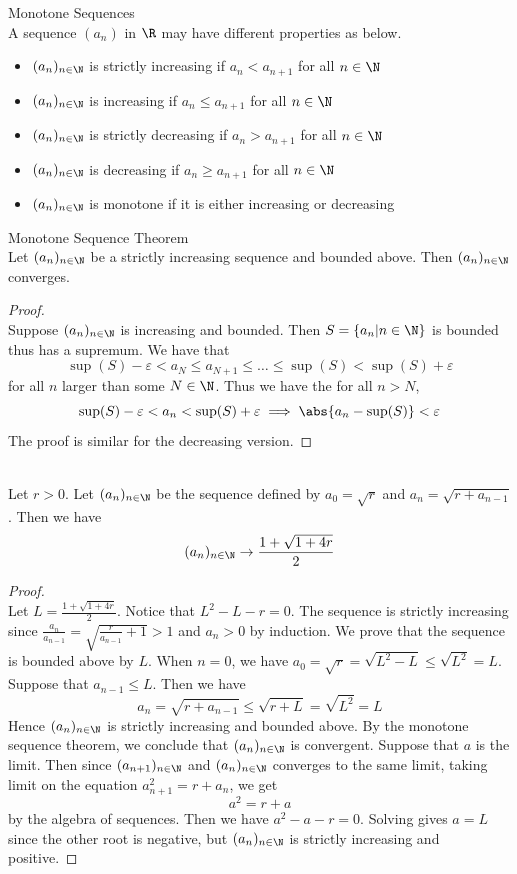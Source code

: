\documentclass[a4paper]{article}
\begin{document}
\begin{defn}{Monotone Sequences}{}\\ A sequence $(a_n)$ in $\R$ may have different properties as below. 
\begin{itemize}
\item $(a_n)_{n\in\N}$ is strictly increasing if $a_n<a_{n+1}$ for all $n\in\N$
\item $(a_n)_{n\in\N}$ is increasing if $a_n\leq a_{n+1}$ for all $n\in\N$
\item $(a_n)_{n\in\N}$ is strictly decreasing if $a_n>a_{n+1}$ for all $n\in\N$
\item $(a_n)_{n\in\N}$ is decreasing if $a_n\geq a_{n+1}$ for all $n\in\N$
\item $(a_n)_{n\in\N}$ is monotone if it is either increasing or decreasing
\end{itemize}
\end{defn}

\begin{thm}{Monotone Sequence Theorem}{}\\
Let $(a_n)_{n\in\N}$ be a strictly increasing sequence and bounded above. Then $(a_n)_{n\in\N}$ converges. 
\begin{proof}\\ Suppose $(a_n)_{n\in\N}$ is increasing and bounded. Then $S=\{a_n|n\in\N\}$ is bounded thus has a supremum. We have that $$\sup(S)-\varepsilon< a_N\leq a_{N+1}\leq\dots\leq\sup(S)<\sup(S)+\varepsilon$$ for all $n$ larger than some $N\in\N$. Thus we have the for all $n>N$, $$\sup(S)-\varepsilon<a_n<\sup(S)+\varepsilon\implies\abs{a_n-\sup(S)}<\varepsilon$$ The proof is similar for the decreasing version. 
\end{proof}
\end{thm}

\begin{eg}{}{}\\
Let $r>0$. Let $(a_n)_{n\in\N}$ be the sequence defined by $a_0=\sqrt{r}$ and $a_n=\sqrt{r+a_{n-1}}$. Then we have $$(a_n)_{n\in\N}\to\frac{1+\sqrt{1+4r}}{2}$$
\begin{proof}\\
Let $L=\frac{1+\sqrt{1+4r}}{2}$. Notice that $L^2-L-r=0$. The sequence is strictly increasing since $\frac{a_n}{a_{n-1}}=\sqrt{\frac{r}{a_{n-1}}+1}>1$ and $a_n>0$ by induction. We prove that the sequence is bounded above by $L$. When $n=0$, we have $a_0=\sqrt{r}=\sqrt{L^2-L}\leq\sqrt{L^2}=L$. Suppose that $a_{n-1}\leq L$. Then we have $$a_n=\sqrt{r+a_{n-1}}\leq\sqrt{r+L}=\sqrt{L^2}=L$$ Hence $(a_n)_{n\in\N}$ is strictly increasing and bounded above. By the monotone sequence theorem, we conclude that $(a_n)_{n\in\N}$ is convergent. Suppose that $a$ is the limit. Then since $(a_{n+1})_{n\in\N}$ and $(a_n)_{n\in\N}$ converges to the same limit, taking limit on the equation $a_{n+1}^2=r+a_n$, we get $$a^2=r+a$$ by the algebra of sequences. Then we have $a^2-a-r=0$. Solving gives $a=L$ since the other root is negative, but $(a_n)_{n\in\N}$ is strictly increasing and positive. 
\end{proof}
\end{eg}
\end{document}
